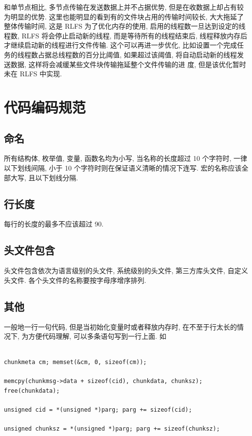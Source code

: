 和单节点相比, 多节点传输在发送数据上并不占据优势, 但是在收数据上却占有较为明显的优势.
这里也能明显的看到有的文件块占用的传输时间较长, 大大拖延了整体传输时间,
这是 RLFS 为了优化内存的使用, 启用的线程数一旦达到设定的线程数,
RLFS 将会停止启动新的线程, 而是等待所有的线程结束后,
线程释放内存后才继续启动新的线程进行文件传输. 这个可以再进一步优化,
比如设置一个完成任务的线程数占据总线程数的百分比阈值,
如果超过该阈值, 将自动启动新的线程发送数据, 这样将会减缓某些文件块传输拖延整个文件传输的进
度, 但是该优化暂时未在 RLFS 中实现.

\section{代码编码规范}
\subsection{命名}
所有结构体, 枚举值, 变量, 函数名均为小写, 当名称的长度超过 10 个字符时,
一律以下划线间隔, 小于 10 个字符时则在保证语义清晰的情况下连写.
宏的名称应该全部大写, 且以下划线分隔.

\subsection{行长度}
每行的长度的最多不应该超过 90.

\subsection{头文件包含}
头文件包含依次为语言级别的头文件, 系统级别的头文件, 第三方库头文件, 自定义头文件.
各个头文件的名称要按字母序增序排列.

\subsection{其他}
一般地一行一句代码, 但是当初始化变量时或者释放内存时,
在不至于行太长的情况下, 为方便代码理解, 可以多条语句写到一行上面. 如

\begin{lstlisting}[style=verb]

chunkmeta cm; memset(&cm, 0, sizeof(cm));

memcpy(chunkmsg->data + sizeof(cid), chunkdata, chunksz); free(chunkdata);

unsigned cid = *(unsigned *)parg; parg += sizeof(cid);

unsigned chunksz = *(unsigned *)parg; parg += sizeof(chunksz);
\end{lstlisting}

